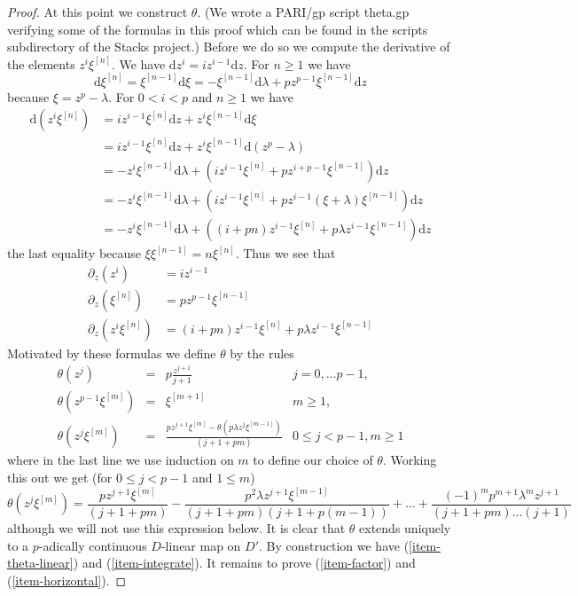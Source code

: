 \begin{proof}
\medskip\noindent
At this point we construct $\theta$. (We wrote a PARI/gp script theta.gp
verifying some of the formulas in this proof which can be found in the
scripts subdirectory of the Stacks project.) Before we do so we compute
the derivative of the elements $z^i \xi^{[n]}$. We have
$\text{d}z^i = i z^{i - 1} \text{d}z$. For $n \geq 1$ we have
$$
\text{d}\xi^{[n]} =
\xi^{[n - 1]} \text{d}\xi =
- \xi^{[n - 1]}\text{d}\lambda + p z^{p - 1} \xi^{[n - 1]}\text{d}z
$$
because $\xi = z^p - \lambda$. For $0 < i < p$ and $n \geq 1$ we have
\begin{align*}
\text{d}(z^i\xi^{[n]})
& =
iz^{i - 1}\xi^{[n]}\text{d}z + z^i\xi^{[n - 1]}\text{d}\xi \\
& =
iz^{i - 1}\xi^{[n]}\text{d}z + z^i\xi^{[n - 1]}\text{d}(z^p - \lambda) \\
& =
- z^i\xi^{[n - 1]}\text{d}\lambda +
(iz^{i - 1}\xi^{[n]} + pz^{i + p - 1}\xi^{[n - 1]})\text{d}z \\
& =
- z^i\xi^{[n - 1]}\text{d}\lambda +
(iz^{i - 1}\xi^{[n]} + pz^{i - 1}(\xi + \lambda)\xi^{[n - 1]})\text{d}z \\
& =
- z^i\xi^{[n - 1]}\text{d}\lambda +
((i + pn)z^{i - 1}\xi^{[n]} + p\lambda z^{i - 1}\xi^{[n - 1]})\text{d}z
\end{align*}
the last equality because $\xi \xi^{[n - 1]} = n\xi^{[n]}$.
Thus we see that
\begin{align*}
\partial_z(z^i) & = i z^{i - 1} \\
\partial_z(\xi^{[n]}) & = p z^{p - 1} \xi^{[n - 1]} \\
\partial_z(z^i\xi^{[n]}) & =
(i + pn) z^{i - 1} \xi^{[n]} + p \lambda z^{i - 1}\xi^{[n - 1]}
\end{align*}
Motivated by these formulas we define $\theta$ by the rules
$$
\begin{matrix}
\theta(z^j)
& = & p\frac{z^{j + 1}}{j + 1}
& j = 0, \ldots p - 1, \\
\theta(z^{p - 1}\xi^{[m]})
& = & \xi^{[m + 1]}
& m \geq 1, \\
\theta(z^j \xi^{[m]})
& = &
\frac{p z^{j + 1} \xi^{[m]} - \theta(p\lambda z^j \xi^{[m - 1]})}{(j + 1 + pm)}
& 0 \leq j < p - 1, m \geq 1
\end{matrix}
$$
where in the last line we use induction on $m$ to define our choice of
$\theta$. Working this out we get (for $0 \leq j < p - 1$ and $1 \leq m$)
$$
\theta(z^j \xi^{[m]}) =
\textstyle{\frac{p z^{j + 1} \xi^{[m]}}{(j + 1 + pm)} -
\frac{p^2 \lambda z^{j + 1} \xi^{[m - 1]}}{(j + 1 + pm)(j + 1 + p(m - 1))} +
\ldots +
\frac{(-1)^m p^{m + 1} \lambda^m z^{j + 1}}
{(j + 1 + pm) \ldots (j + 1)}}
$$
although we will not use this expression below. It is clear that $\theta$
extends uniquely to a $p$-adically continuous $D$-linear map on $D'$.
By construction we have (\ref{item-theta-linear}) and (\ref{item-integrate}).
It remains to prove (\ref{item-factor}) and (\ref{item-horizontal}).


\end{proof}
